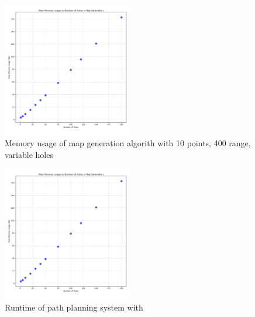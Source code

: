 \documentclass[final]{cmpreport_02}
\begin{document}
\begin{figure}[h!]
	\centering
	\includegraphics[width=0.5\textwidth]{./images/mapGenHolesMem.png}
	\caption{Memory usage of map generation algorith with 10 points, 400 range, variable holes}
	\label{PE:mg:memHoles}
\end{figure}


\begin{figure}[h!]
	\centering
	\includegraphics[width=0.5\textwidth]{./images/mapGenHolesMem.png}
	\caption{Runtime of path planning system with }
    \label{PE:p:setSize}
\end{figure}
\end{document}
